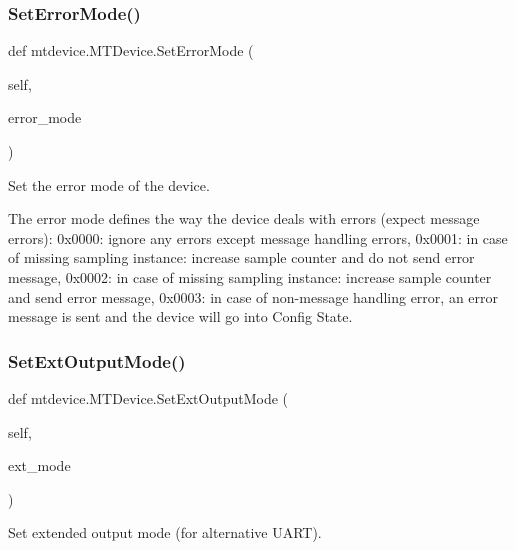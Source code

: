 \subsubsection{\texorpdfstring{Set\+Error\+Mode()}{SetErrorMode()}}
{\footnotesize\ttfamily def mtdevice.\+M\+T\+Device.\+Set\+Error\+Mode (\begin{DoxyParamCaption}\item[{}]{self,  }\item[{}]{error\+\_\+mode }\end{DoxyParamCaption})}

\begin{DoxyVerb}Set the error mode of the device.

The error mode defines the way the device deals with errors (expect
message errors):
    0x0000: ignore any errors except message handling errors,
    0x0001: in case of missing sampling instance: increase sample
counter and do not send error message,
    0x0002: in case of missing sampling instance: increase sample
counter and send error message,
    0x0003: in case of non-message handling error, an error message is
sent and the device will go into Config State.
\end{DoxyVerb}
 \mbox{\label{classmtdevice_1_1MTDevice_a5cd787accdbf2aec47fc0edf2835df40}} 
\subsubsection{\texorpdfstring{Set\+Ext\+Output\+Mode()}{SetExtOutputMode()}}
{\footnotesize\ttfamily def mtdevice.\+M\+T\+Device.\+Set\+Ext\+Output\+Mode (\begin{DoxyParamCaption}\item[{}]{self,  }\item[{}]{ext\+\_\+mode }\end{DoxyParamCaption})}

\begin{DoxyVerb}Set extended output mode (for alternative UART).\end{DoxyVerb}
 \mbox{\label{classmtdevice_1_1MTDevice_adb65653ac4a1509c3fbd9122b63365da}} 
